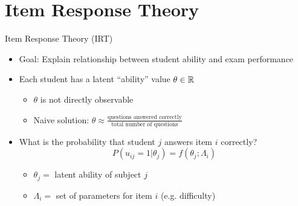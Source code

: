 \documentclass{beamer}
\def \R{\ensuremath \mathbb{R}}
\def \d{\ensuremath \delta}
\theoremstyle{definition}
\begin{document}
\section{Item Response Theory}

\begin{frame}{Item Response Theory (IRT)}
\begin{itemize}
  \item Goal: Explain relationship between student ability and exam performance
  \item Each student has a latent ``ability'' value $\theta \in \R$
  \begin{itemize}
    \item<2-> $\theta$ is not directly observable
    \item<2-> Naive solution: $\theta \approx \displaystyle\frac{\text{questions answered correctly}}{\text{total number of questions}}$
  \end{itemize}
  \smallskip
  \item<3> What is the probability that student $j$ answers item $i$ correctly?
  \[P(u_{ij}=1 | \theta_j) = f(\theta_j; \Lambda_i)\]
  \begin{itemize}
    \item<3> $\theta_j =$ latent ability of subject $j$
    \item<3> $\Lambda_i =$ set of parameters for item $i$ (e.g. difficulty)
  \end{itemize}
\end{itemize}
\end{frame}

\end{document}
